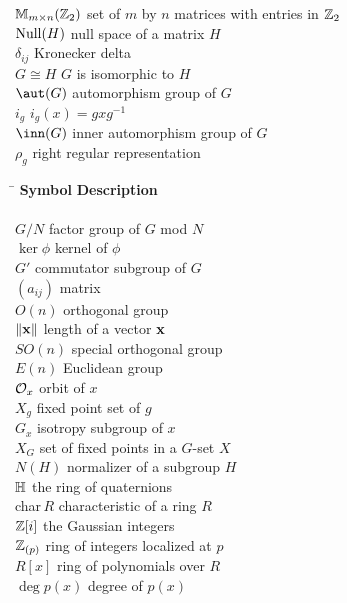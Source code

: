 \begin{tabbing}
${\Bbb M}_{m \times n}({\Bbb Z}_2)$ \>  set of $m$ by $n$ matrices with 
     entries in ${\Bbb Z}_2$ \\
${\rm Null}(H)$ \>  null space of a matrix $H$ \\
$\delta_{ij}$ \>  Kronecker delta \\
$G \cong H$ \>  $G$ is isomorphic to $H$ \\
$\aut(G)$ \>  automorphism group of $G$ \\
$i_g$ \>  $i_g(x) = gxg^{-1}$ \\
$\inn(G)$ \>  inner automorphism group of $G$ \\
$\rho_g$ \>  right regular representation \\
\end{tabbing} \clearpage
\begin{tabbing}
\hspace{1.9775in} \= \kill
{\bf Symbol}  \>  {\bf Description} \\
     \mbox{\hspace*{1in}} \\
$G/N$ \>  factor group of $G$ mod $N$ \\
$\ker \phi$ \>  kernel of $\phi$ \\
$G'$ \>  commutator subgroup of $G$ \\
$(a_{ij})$ \>  matrix \\
$O(n)$ \>  orthogonal group \\
$\| {\bold x} \|$ \>  length of a vector ${\bold x}$ \\
$SO(n)$ \>  special orthogonal group \\
$E(n)$ \>  Euclidean group \\
${\cal O}_x$ \>  orbit of $x$ \\
$X_g$ \>  fixed point set of $g$ \\
$G_x$ \>  isotropy subgroup of $x$ \\
$X_G$ \>  set of fixed points in a $G$-set $X$ \\
$N(H)$ \>  normalizer of a subgroup $H$ \\
${\Bbb H}$ \>  the ring of quaternions \\
\mbox{char$\, R$} \>  characteristic of a ring $R$ \\
${\Bbb Z}[i ]$ \>  the Gaussian integers \\
${\Bbb Z}_{(p)}$ \>  ring of integers localized at $p$ \\
$R[x]$ \>  ring of polynomials over $R$ \\
$\deg p(x)$ \>  degree of $p(x)$ \\

\end{tabbing}
